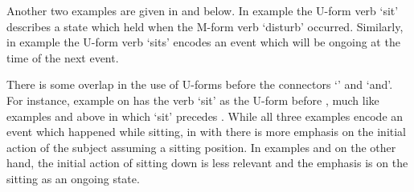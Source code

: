 Another two examples are given in  and  below.
In example  the U-form verb  `sit'
describes a state which held when the M-form verb  `disturb' occurred.
Similarly, in example  the U-form verb  `sits'
encodes an event which will be ongoing at the time of the next event.

\begin{exe}
\vspace{4pt}
	\label{ex:130825-6, 21.34}
	\label{ex:130913-1, 2.43}
\end{exe}

There is some overlap in the use of U-forms before the connectors  `' and  `and'.
For instance, example  on 
has the verb  `sit' as the U-form before ,
much like examples  and  above
in which  `sit' precedes .
While all three examples encode an event which happened while sitting,
in  with  there is more emphasis
on the initial action of the subject assuming a sitting position.
In examples  and  on the other hand,
the initial action of sitting down is less relevant
and the emphasis is on the sitting as an ongoing state.


